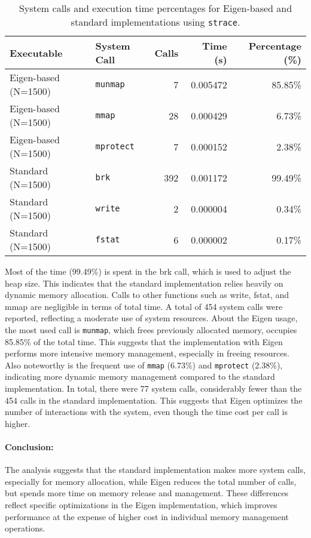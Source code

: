 \documentclass{article}
\begin{document}
    \begin{table}[h!]
        \centering
        \begin{tabular}{|l|l|r|r|r|}
            \hline
            \textbf{Executable} & \textbf{System Call} & \textbf{Calls} & \textbf{Time (s)} & \textbf{Percentage (\%)} \\ \hline
            Eigen-based (N=1500) & \texttt{munmap} & 7 & 0.005472 & 85.85\% \\ \hline
            Eigen-based (N=1500) & \texttt{mmap} & 28 & 0.000429 & 6.73\% \\ \hline
            Eigen-based (N=1500) & \texttt{mprotect} & 7 & 0.000152 & 2.38\% \\ \hline
            Standard (N=1500) & \texttt{brk} & 392 & 0.001172 & 99.49\% \\ \hline
            Standard (N=1500) & \texttt{write} & 2 & 0.000004 & 0.34\% \\ \hline
            Standard (N=1500) & \texttt{fstat} & 6 & 0.000002 & 0.17\% \\ \hline
        \end{tabular}
        \caption{System calls and execution time percentages for Eigen-based and standard implementations using \texttt{strace}.}
        \label{tab:strace}
    \end{table}

    Most of the time (99.49\%) is spent in the brk call, which is used to adjust the heap size. This indicates that the standard implementation relies heavily on dynamic memory allocation. Calls to other functions such as write, fstat, and mmap are negligible in terms of total time. A total of 454 system calls were reported, reflecting a moderate use of system resources. About the Eigen usage, the most used call is \texttt{munmap}, which frees previously allocated memory, occupies 85.85\% of the total time. This suggests that the implementation with Eigen performs more intensive memory management, especially in freeing resources. Also noteworthy is the frequent use of \texttt{mmap} (6.73\%) and \texttt{mprotect} (2.38\%), indicating more dynamic memory management compared to the standard implementation. In total, there were 77 system calls, considerably fewer than the 454 calls in the standard implementation. This suggests that Eigen optimizes the number of interactions with the system, even though the time cost per call is higher.

    \paragraph{Conclusion:}
    The analysis suggests that the standard implementation makes more system calls, especially for memory allocation, while Eigen reduces the total number of calls, but spends more time on memory release and management. These differences reflect specific optimizations in the Eigen implementation, which improves performance at the expense of higher cost in individual memory management operations.
\end{document}
